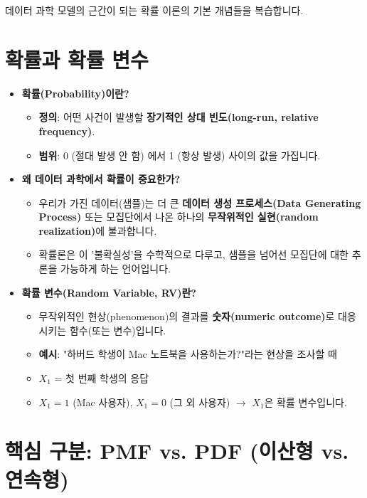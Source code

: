 \documentclass[11pt,a4paper]{book}
\theoremstyle{definition}
\begin{document}
데이터 과학 모델의 근간이 되는 확률 이론의 기본 개념들을 복습합니다.

\section{확률과 확률 변수}

\begin{itemize}
    \item \textbf{확률(Probability)이란?}
        \begin{itemize}
            \item \textbf{정의}: 어떤 사건이 발생할 \textbf{장기적인 상대 빈도(long-run, relative frequency)}.
            \item \textbf{범위}: 0 (절대 발생 안 함) 에서 1 (항상 발생) 사이의 값을 가집니다.
        \end{itemize}
    \item \textbf{왜 데이터 과학에서 확률이 중요한가?}
        \begin{itemize}
            \item 우리가 가진 데이터(샘플)는 더 큰 \textbf{데이터 생성 프로세스(Data Generating Process)} 또는 모집단에서 나온 하나의 \textbf{무작위적인 실현(random realization)}에 불과합니다.
            \item 확률론은 이 '불확실성'을 수학적으로 다루고, 샘플을 넘어선 모집단에 대한 추론을 가능하게 하는 언어입니다.
        \end{itemize}
    \item \textbf{확률 변수(Random Variable, RV)란?}
        \begin{itemize}
            \item 무작위적인 현상(phenomenon)의 결과를 \textbf{숫자(numeric outcome)}로 대응시키는 함수(또는 변수)입니다.
            \item \textbf{예시}: "하버드 학생이 Mac 노트북을 사용하는가?"라는 현상을 조사할 때
            \item $X_1$ = 첫 번째 학생의 응답
            \item $X_1 = 1$ (Mac 사용자), $X_1 = 0$ (그 외 사용자) $\to$ $X_1$은 확률 변수입니다.
        \end{itemize}
\end{itemize}

\section{핵심 구분: PMF vs. PDF (이산형 vs. 연속형)}
\label{sec:pmf_pdf}
\end{document}
